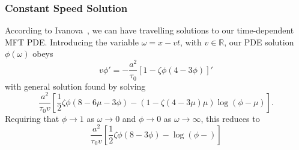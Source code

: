 \subsubsection{Constant Speed Solution}
According to Ivanova~\cite{ivanova2007}, we can have travelling solutions to our time-dependent MFT PDE. Introducing the variable $\omega = x - vt$, with $v\in \mathbb{R}$, our PDE solution $\phi(\omega)$ obeys
\begin{equation}
 v \phi ' = -\frac{a^2}{\tau_0} \left[ 1-\zeta \phi \left(4-3\phi\right) \right] '
\end{equation}
with general solution found by solving
\begin{equation}
 \frac{a^2}{\tau_0 v} \left[ \frac{1}{2} \zeta \phi \left(8-6\mu-3\phi\right) - \left(1-\zeta\left(4-3\mu\right)\mu\right) \log{\left(\phi-\mu\right)} \right].
\end{equation}
Requiring that $\phi \rightarrow  1$ as $\omega \rightarrow 0$ and $\phi \rightarrow 0$ as $\omega \rightarrow \infty$, this reduces to
\begin{equation}
 \frac{a^2}{\tau_0 v} \left[ \frac{1}{2} \zeta \phi \left(8-3\phi\right) - \log{\left(\phi-\right)} \right]
\end{equation}

